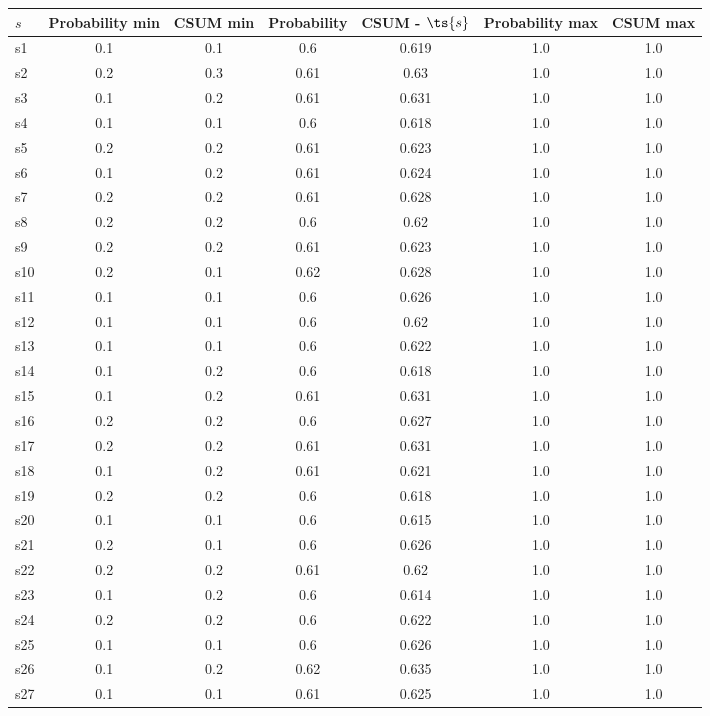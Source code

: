 \documentclass{article}
\begin{document}
\noindent\begin{tabular}{|l|c|c|c|c|c|c|}
\hline
$s$& Probability min & CSUM min & Probability & CSUM - $\ts{s}$ & Probability max & CSUM max\\
\hline
s1 &0.1 & 0.1 & 0.6 & 0.619 & 1.0 & 1.0\\
\hline
s2 &0.2 & 0.3 & 0.61 & 0.63 & 1.0 & 1.0\\
\hline
s3 &0.1 & 0.2 & 0.61 & 0.631 & 1.0 & 1.0\\
\hline
s4 &0.1 & 0.1 & 0.6 & 0.618 & 1.0 & 1.0\\
\hline
s5 &0.2 & 0.2 & 0.61 & 0.623 & 1.0 & 1.0\\
\hline
s6 &0.1 & 0.2 & 0.61 & 0.624 & 1.0 & 1.0\\
\hline
s7 &0.2 & 0.2 & 0.61 & 0.628 & 1.0 & 1.0\\
\hline
s8 &0.2 & 0.2 & 0.6 & 0.62 & 1.0 & 1.0\\
\hline
s9 &0.2 & 0.2 & 0.61 & 0.623 & 1.0 & 1.0\\
\hline
s10 &0.2 & 0.1 & 0.62 & 0.628 & 1.0 & 1.0\\
\hline
s11 &0.1 & 0.1 & 0.6 & 0.626 & 1.0 & 1.0\\
\hline
s12 &0.1 & 0.1 & 0.6 & 0.62 & 1.0 & 1.0\\
\hline
s13 &0.1 & 0.1 & 0.6 & 0.622 & 1.0 & 1.0\\
\hline
s14 &0.1 & 0.2 & 0.6 & 0.618 & 1.0 & 1.0\\
\hline
s15 &0.1 & 0.2 & 0.61 & 0.631 & 1.0 & 1.0\\
\hline
s16 &0.2 & 0.2 & 0.6 & 0.627 & 1.0 & 1.0\\
\hline
s17 &0.2 & 0.2 & 0.61 & 0.631 & 1.0 & 1.0\\
\hline
s18 &0.1 & 0.2 & 0.61 & 0.621 & 1.0 & 1.0\\
\hline
s19 &0.2 & 0.2 & 0.6 & 0.618 & 1.0 & 1.0\\
\hline
s20 &0.1 & 0.1 & 0.6 & 0.615 & 1.0 & 1.0\\
\hline
s21 &0.2 & 0.1 & 0.6 & 0.626 & 1.0 & 1.0\\
\hline
s22 &0.2 & 0.2 & 0.61 & 0.62 & 1.0 & 1.0\\
\hline
s23 &0.1 & 0.2 & 0.6 & 0.614 & 1.0 & 1.0\\
\hline
s24 &0.2 & 0.2 & 0.6 & 0.622 & 1.0 & 1.0\\
\hline
s25 &0.1 & 0.1 & 0.6 & 0.626 & 1.0 & 1.0\\
\hline
s26 &0.1 & 0.2 & 0.62 & 0.635 & 1.0 & 1.0\\
\hline
s27 &0.1 & 0.1 & 0.61 & 0.625 & 1.0 & 1.0\\

\end{tabular}
\end{document}
